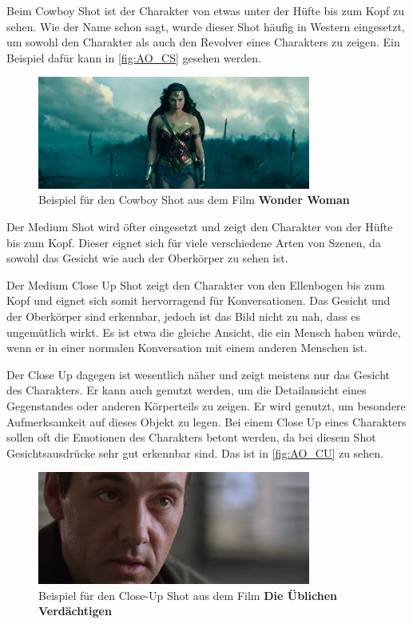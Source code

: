 Beim Cowboy Shot ist der Charakter von etwas unter der Hüfte bis zum Kopf zu sehen. Wie der Name schon sagt, wurde dieser Shot häufig in Western eingesetzt, um sowohl den Charakter als auch den Revolver eines Charakters zu zeigen. Ein Beispiel dafür kann in \autoref{fig:AO_CS} gesehen werden.

\begin{figure}[h]
    \centering
    \includegraphics[width=0.8\textwidth]{img/AO_CS.jpg}
    \caption[Imagefilm: Cowboy Shot]{Beispiel für den Cowboy Shot aus dem Film \textbf{Wonder Woman}}
    \label{fig:AO_CS}
\end{figure}

Der Medium Shot wird öfter eingesetzt und zeigt den Charakter von der Hüfte bis zum Kopf. Dieser eignet sich für viele verschiedene Arten von Szenen, da sowohl das Gesicht wie auch der Oberkörper zu sehen ist.

Der Medium Close Up Shot zeigt den Charakter von den Ellenbogen bis zum Kopf und eignet sich somit hervorragend für Konversationen. Das Gesicht und der Oberkörper sind erkennbar, jedoch ist das Bild nicht zu nah, dass es ungemütlich wirkt. Es ist etwa die gleiche Ansicht, die ein Mensch haben würde, wenn er in einer normalen Konversation mit einem anderen Menschen ist. 

Der Close Up dagegen ist wesentlich näher und zeigt meistens nur das Gesicht des Charakters. Er kann auch genutzt werden, um die Detailansicht eines Gegenstandes oder anderen Körperteils zu zeigen. Er wird genutzt, um besondere Aufmerksamkeit auf dieses Objekt zu legen. Bei einem Close Up eines Charakters sollen oft die Emotionen des Charakters betont werden, da bei diesem Shot Gesichtsausdrücke sehr gut erkennbar sind. Das ist in \autoref{fig:AO_CU} zu sehen.

\begin{figure}[h]
    \centering
    \includegraphics[width=0.8\textwidth]{img/AO_CU.jpg}
    \caption[Imagefilm: Close Up Shot]{Beispiel für den Close-Up Shot aus dem Film \textbf{Die Üblichen Verdächtigen}}
    \label{fig:AO_CU}
\end{figure}

